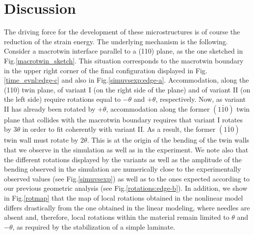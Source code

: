 \documentclass[twocolumn,amsmath,amssymb]{revtex4}
\begin{document}
\section{\label{sec:level2}Discussion}
The driving force for the development of these microstructures is of course the reduction of the strain energy. The underlying mechanism is the following. Consider a macrotwin interface parallel to a (110) plane, as the one sketched in Fig.\ref{macrotwin_sketch}. This situation corresponds to the macrotwin boundary in the upper right corner of the final configuration displayed in Fig.\ref{time_evnl:edge-c} and also in Fig.\ref{simuvsexp:edge-a}. Accommodation, along the (110) twin plane, of variant I (on the right side of the plane) and of variant II (on the left side) require rotations equal to $-\theta$ and $+\theta$, respectively. Now, as variant II has already been rotated by $+\theta$, accommodation along the former $(1 \bar 1 0)$ twin plane that collides with the macrotwin boundary requires that variant I rotates by $3\theta$ in order to fit coherently with variant II. As a result, the former $(1 \bar 1 0)$ twin wall must rotate by $2\theta$.  This is at the origin of the bending of the twin walls that we observe in the simulation as well as in the experiment. We note also that the different rotations displayed by the variants as well as the amplitude of the bending observed in the simulation are numerically close to the experimentally observed values  (see Fig.\ref{simuvsexp}) as well as to the  ones expected according to our previous geometric analysis (see Fig.\ref{rotations:edge-b}). In addition, we show in Fig.\ref{rotmap} that the  map  of local rotations obtained in the nonlinear model differs drastically from the one obtained in the linear modeling, where needles are absent and, therefore, local rotations within the material remain limited to $\theta$ and $-\theta$, as required by the stabilization of a simple laminate.
\end{document}
